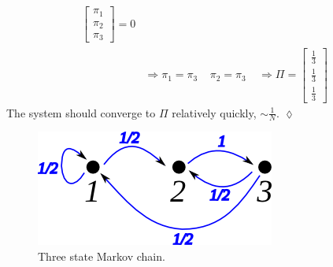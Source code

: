 \documentclass[lecture,12pt,]{pcms-l}
\begin{document}
\begin{example}
\begin{align*}
\left[\begin{array}{c} \pi_1 \\ \pi_2 \\ \pi_3 \end{array}\right] = 0 \\
&\Rightarrow \pi_1=\pi_3 ~~~~~ \pi_2=\pi_3 ~~~~~ \Rightarrow \Pi=\left[\begin{array}{c} \frac{1}{3} \\ \frac{1}{3} \\ \frac{1}{3} \end{array}\right]
\end{align*}
The system should converge to $\Pi$ relatively quickly, $\sim\frac{1}{N}$.
$\lozenge$
\end{example}

\begin{figure}[ht!]
	\centering
	\includegraphics[width=.4\textwidth]{images/10mc3b}
	\caption{Three state Markov chain.}
	\label{fig:10mc3b}
\end{figure}
\end{document}
